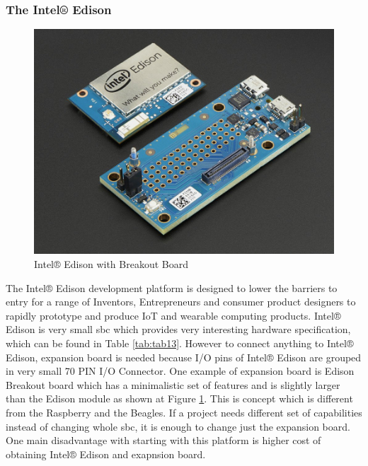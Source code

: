 \subsubsection{The Intel® Edison} %
\label{ssub:the_intel_edison}
\begin{figure}[H]
\begin{center}
\captionsetup{font=small}
\includegraphics[scale=0.3]{pics/edison.jpg}
\caption{Intel® Edison with Breakout Board\cite{edison_pic}}
\label{fig:ch5}
\end{center}
\end{figure}
The Intel® Edison development platform is designed to lower the barriers to entry for a range of Inventors, Entrepreneurs and consumer product designers to rapidly prototype and produce IoT and wearable computing products.\cite{intel_what}\newline
Intel® Edison is very small \gls{sbc} which provides very interesting hardware specification, which can be found in Table \ref{tab:tab13}. However to connect anything to Intel® Edison, expansion board is needed because I/O pins of Intel® Edison are grouped in very small 70 PIN I/O Connector. One example of expansion board is Edison Breakout board which has a minimalistic set of features and is slightly larger than the Edison module as shown at Figure \ref{fig:ch5}. This is concept which is different from the Raspberry and the Beagles. If a project needs different set of capabilities instead of changing whole \gls{sbc}, it is enough to change just the expansion board. One main disadvantage with starting with this platform is higher cost of obtaining Intel® Edison and exapnsion board.
